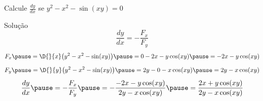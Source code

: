 \begin{question}
  Calcule \(\frac{dy}{dx}\) se \(y^2-x^2-\sin(xy) = 0\)
\end{question}

\begin{resolution}{Solução}
  \[
    \frac{dy}{dx} = -\frac{F_x}{F_y}
  \]
  \pause
  \[
    F_x
    \pause
    = \D{}{x}\big(y^2-x^2-\sin(xy)\big)
    \pause
    = 0 - 2x - y\cos(xy)
    \pause
    = - 2x - y\cos(xy)
  \]
  \pause
  \[
    F_y
    \pause
    = \D{}{y}\big(y^2-x^2-\sin(xy)\big)
    \pause
    = 2y - 0 - x\cos(xy)
    \pause
    = 2y - x\cos(xy)
  \]
  \pause
  \[
    \frac{dy}{dx}
    \pause
    = -\frac{F_x}{F_y}
    \pause
    = -\frac{- 2x - y\cos(xy)}{2y - x\cos(xy)}
    \pause
    = \frac{2x + y\cos(xy)}{2y - x\cos(xy)}
  \]
\end{resolution}

